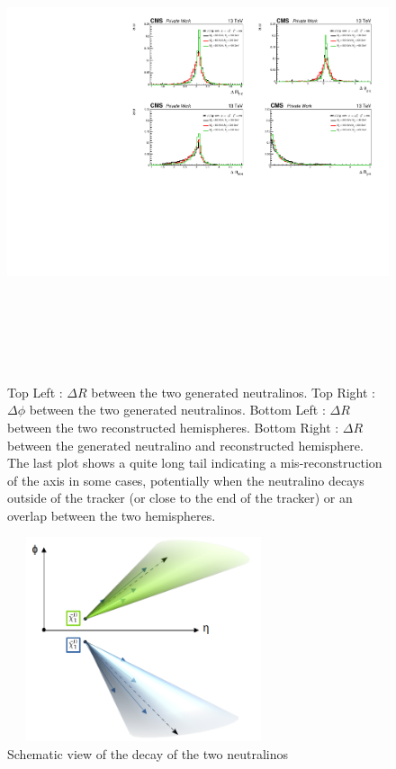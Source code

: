\documentclass{cernatlasnote}
\begin{document}
\begin{figure}[ht]
\centering
\includegraphics[height=14cm, width=17cm, trim= 2cm 0cm 0cm 0.cm,clip]{images/Topology/dPhi_GenGen.pdf}
\caption{\label{fig:dRNEUNEU} Top Left : $\Delta R$ between the two generated neutralinos. Top Right :  $\Delta \phi$ between the two generated neutralinos. Bottom Left : $\Delta R$ between the two reconstructed hemispheres. Bottom Right : $\Delta R$ between the generated neutralino and reconstructed hemisphere. The last plot shows a quite long tail indicating a mis-reconstruction of the axis in some cases, potentially when the neutralino decays outside of the tracker (or close to the end of the tracker) or an overlap between the two hemispheres.}
\end{figure}

\begin{figure}[ht]
\centering
\includegraphics[height=6cm, width=8cm, trim= 0cm 0cm 0cm 0.cm,clip]{images/Topology/topo.png}
\caption{\label{fig:Geometry} Schematic view of the decay of the two neutralinos}
\end{figure}
\FloatBarrier
\end{document}
